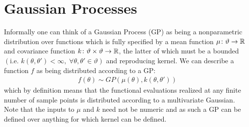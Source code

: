 \section{Gaussian Processes}
\label{sec:opt:GPs}

Informally one can think of a Gaussian Process (GP) \citep{rasmussen2006gaussian} as being a nonparametric distribution over functions which is fully specified by a mean function $\mu \colon \vartheta \rightarrow \mathbb{R}$ and covariance function $k \colon \vartheta \times \vartheta \rightarrow \mathbb{R}$, the latter of which must be a bounded $\left(\text{i.e. }k\left(\theta,\theta'\right)<\infty, \; \forall \theta,\theta' \in \vartheta\right)$ and reproducing kernel.  We can describe a function $f$ as being distributed according to a GP:
\begin{align}
\label{eq:GP}
f \left(\theta\right) \sim GP \left(\mu\left(\theta\right), k\left(\theta,\theta'\right)\right)
\end{align}
which by definition means that the functional evaluations realized at any finite number of sample points is distributed according to a multivariate Gaussian. Note that the inputs to $\mu$ and $k$ need not be numeric and as such a GP can be defined over anything for which kernel can be defined.

